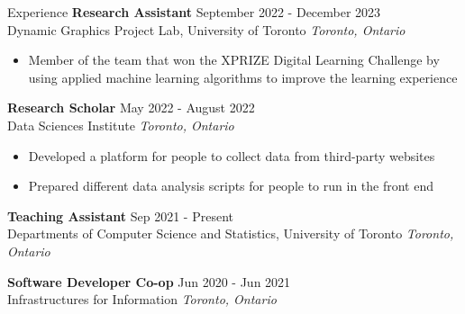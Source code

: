 \documentclass{resume} %
\begin{document}
\begin{rSection}{Experience}
    \textbf{Research Assistant} \hfill September 2022 - December 2023\\Dynamic Graphics Project Lab, University of Toronto \hfill \textit{Toronto, Ontario}
    \begin{itemize}
        \itemsep -3pt {} 
        \item Member of the team that won the XPRIZE Digital Learning Challenge by using applied machine learning algorithms to improve the learning experience
    \end{itemize}

    \textbf{Research Scholar} \hfill May 2022 - August 2022\\Data Sciences Institute \hfill \textit{Toronto, Ontario}
    \begin{itemize}
        \itemsep -3pt {} 
        \item Developed a platform for people to collect data from third-party websites
        \item Prepared different data analysis scripts for people to run in the front end
    \end{itemize}

 
    \textbf{Teaching Assistant} \hfill Sep 2021 - Present\\Departments of Computer Science and Statistics, University of Toronto \hfill \textit{Toronto, Ontario}
    
    \textbf{Software Developer Co-op} \hfill Jun 2020 - Jun 2021\\Infrastructures for Information \hfill \textit{Toronto, Ontario}

\end{rSection} 

\end{document}
